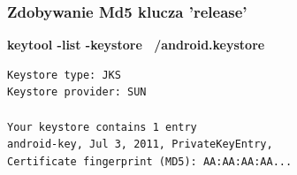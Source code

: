 \documentclass{beamer}
\begin{document}
\begin{frame}[fragile]
\frametitle{Zdobywanie Md5 klucza 'release'}

\textbf{keytool -list -keystore ~/android.keystore }

\begin{lstlisting}
Keystore type: JKS
Keystore provider: SUN

Your keystore contains 1 entry
android-key, Jul 3, 2011, PrivateKeyEntry, 
Certificate fingerprint (MD5): AA:AA:AA:AA...
\end{lstlisting}

\end{frame}
\end{document}
